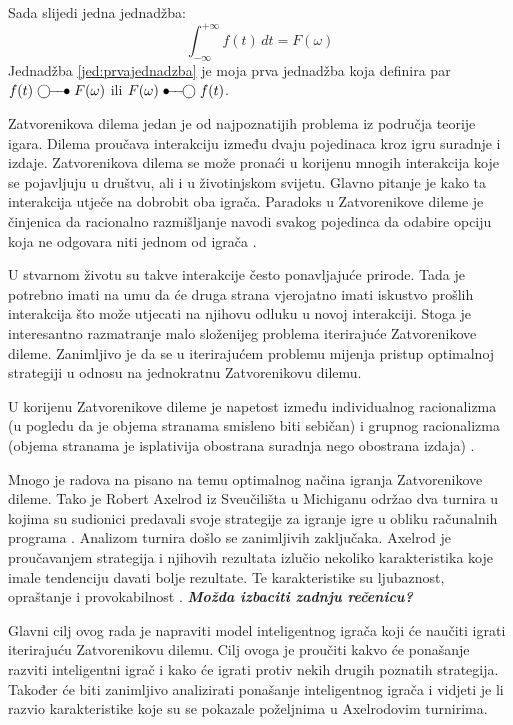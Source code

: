 \documentclass[zavrsnirad]{fer}
\begin{document}
Sada slijedi jedna jednadžba:
\begin{equation}
  \label{jed:prvajednadzba}
  \int_{-\infty}^{+\infty}f(t)\,dt=F(\omega)
\end{equation}
Jednadžba \eqref{jed:prvajednadzba} je moja prva jednadžba koja definira par $f(t)\ufrek F(\omega)$ ili $F(\omega)\uvrem f(t)$.

\cite{1980Axelrod1}
\cite{1980Axelrod2}
\cite{igraHrEnc}

\break

	Zatvorenikova dilema jedan je od najpoznatijih problema iz područja teorije igara. Dilema proučava interakciju između dvaju pojedinaca kroz igru suradnje i izdaje. Zatvorenikova dilema se može pronaći u korijenu mnogih interakcija koje se pojavljuju u društvu, ali i u životinjskom svijetu. Glavno pitanje je kako ta interakcija utječe na dobrobit oba igrača. Paradoks u Zatvorenikove dileme je činjenica da racionalno razmišljanje navodi svakog pojedinca da odabire opciju koja ne odgovara niti jednom od igrača \cite{PrisDilemmaHrEnc}.
	
	U stvarnom životu su takve interakcije često ponavljajuće prirode. Tada je potrebno imati na umu da će druga strana vjerojatno imati iskustvo prošlih interakcija što može utjecati na njihovu odluku u novoj interakciji. Stoga je interesantno razmatranje malo složenijeg problema iterirajuće Zatvorenikove dileme. Zanimljivo je da se u iterirajućem problemu mijenja pristup optimalnoj strategiji u odnosu na jednokratnu Zatvorenikovu dilemu.
	
	U korijenu Zatvorenikove dileme je napetost između individualnog racionalizma (u pogledu da je objema stranama smisleno biti sebičan) i grupnog racionalizma (objema stranama je isplativija obostrana suradnja nego obostrana izdaja) \cite{1980Axelrod1}.
	
	Mnogo je radova na pisano na temu optimalnog načina igranja Zatvorenikove dileme. Tako je Robert Axelrod iz Sveučilišta u Michiganu održao dva turnira u kojima su sudionici predavali svoje strategije za igranje igre u obliku računalnih programa \cite{1980Axelrod1} \cite{1980Axelrod2}. Analizom turnira došlo se zanimljivih zaključaka. Axelrod je proučavanjem strategija i njihovih rezultata izlučio nekoliko karakteristika koje imale tendenciju davati bolje rezultate. Te karakteristike su ljubaznost, opraštanje i provokabilnost \cite{1980Axelrod2}. \textit{\textbf{Možda izbaciti zadnju rečenicu?}}
	
	Glavni cilj ovog rada je napraviti model inteligentnog igrača koji će naučiti igrati iterirajuću Zatvorenikovu dilemu. Cilj ovoga je proučiti kakvo će ponašanje razviti inteligentni igrač i kako će igrati protiv nekih drugih poznatih strategija. Također će biti zanimljivo analizirati ponašanje inteligentnog igrača i vidjeti je li razvio karakteristike koje su se pokazale poželjnima u Axelrodovim turnirima.
\end{document}
